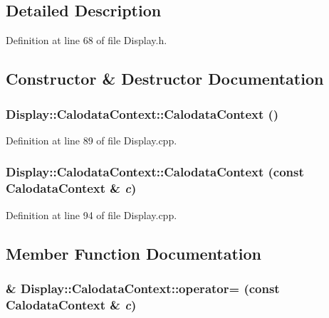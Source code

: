 \subsection{Detailed Description}


Definition at line 68 of file Display.h.

\subsection{Constructor \& Destructor Documentation}
\hypertarget{struct_d_d4hep_1_1_display_1_1_calodata_context_ac1928f77613385e401e1b850ace44faa}{
\subsubsection[{CalodataContext}]{\setlength{\rightskip}{0pt plus 5cm}Display::CalodataContext::CalodataContext ()}}
\label{struct_d_d4hep_1_1_display_1_1_calodata_context_ac1928f77613385e401e1b850ace44faa}


Definition at line 89 of file Display.cpp.\hypertarget{struct_d_d4hep_1_1_display_1_1_calodata_context_ae66034e60c417d10aac4c068337e85a3}{
\subsubsection[{CalodataContext}]{\setlength{\rightskip}{0pt plus 5cm}Display::CalodataContext::CalodataContext (const {\bf CalodataContext} \& {\em c})}}
\label{struct_d_d4hep_1_1_display_1_1_calodata_context_ae66034e60c417d10aac4c068337e85a3}


Definition at line 94 of file Display.cpp.

\subsection{Member Function Documentation}
\hypertarget{struct_d_d4hep_1_1_display_1_1_calodata_context_a968ee17376ea7bbab48975b221184f5e}{
\subsubsection[{operator=}]{ \& Display::CalodataContext::operator= (const {\bf CalodataContext} \& {\em c})}}
\label{struct_d_d4hep_1_1_display_1_1_calodata_context_a968ee17376ea7bbab48975b221184f5e}


